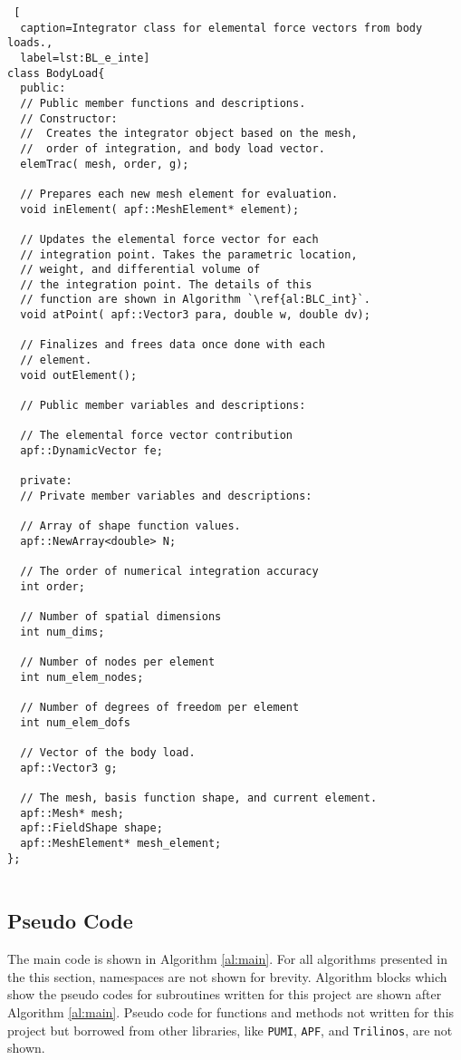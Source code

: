 \documentclass[a4paper, 12pt]{article}
\begin{document}
\begin{lstlisting} [
  caption=Integrator class for elemental force vectors from body loads.,
  label=lst:BL_e_inte]
class BodyLoad{
  public:
  // Public member functions and descriptions.
  // Constructor:
  //  Creates the integrator object based on the mesh,
  //  order of integration, and body load vector.
  elemTrac( mesh, order, g);

  // Prepares each new mesh element for evaluation.
  void inElement( apf::MeshElement* element);

  // Updates the elemental force vector for each 
  // integration point. Takes the parametric location,
  // weight, and differential volume of 
  // the integration point. The details of this 
  // function are shown in Algorithm `\ref{al:BLC_int}`.
  void atPoint( apf::Vector3 para, double w, double dv);

  // Finalizes and frees data once done with each 
  // element.
  void outElement();

  // Public member variables and descriptions:

  // The elemental force vector contribution
  apf::DynamicVector fe;

  private:
  // Private member variables and descriptions:

  // Array of shape function values.
  apf::NewArray<double> N;

  // The order of numerical integration accuracy
  int order;

  // Number of spatial dimensions
  int num_dims;
  
  // Number of nodes per element
  int num_elem_nodes;

  // Number of degrees of freedom per element
  int num_elem_dofs

  // Vector of the body load.
  apf::Vector3 g;

  // The mesh, basis function shape, and current element.
  apf::Mesh* mesh;
  apf::FieldShape shape;
  apf::MeshElement* mesh_element;
};
  
\end{lstlisting}
\vspace{\baselineskip}

\subsection{Pseudo Code} \label{subsec:pseudo}
The main code is shown in Algorithm \ref{al:main}. For all 
algorithms presented in the this section, namespaces 
are not shown for brevity. Algorithm blocks which 
show the pseudo codes for subroutines written for this 
project are shown after Algorithm \ref{al:main}. 
Pseudo code for functions and methods not written for this 
project but borrowed from other libraries, like \texttt{PUMI},
\texttt{APF}, and \texttt{Trilinos}, are not shown.
\end{document}
